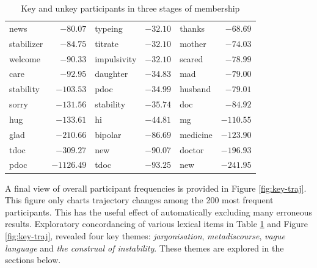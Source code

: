 \begin{table}[p]
\begin{tabular}{lrlrlr}
           news & $  -80.07$ &         typeing & $-32.10$ &      thanks & $ -68.69$ \\
     stabilizer & $  -84.75$ &         titrate & $-32.10$ &      mother & $ -74.03$ \\
        welcome & $  -90.33$ &     impulsivity & $-32.10$ &      scared & $ -78.99$ \\
           care & $  -92.95$ &        daughter & $-34.83$ &         mad & $ -79.00$ \\
      stability & $ -103.53$ &            pdoc & $-34.99$ &     husband & $ -79.01$ \\
          sorry & $ -131.56$ &       stability & $-35.74$ &         doc & $ -84.92$ \\
            hug & $ -133.61$ &              hi & $-44.81$ &          mg & $-110.55$ \\
           glad & $ -210.66$ &         bipolar & $-86.69$ &    medicine & $-123.90$ \\
           tdoc & $ -309.27$ &             new & $-90.07$ &      doctor & $-196.93$ \\
           pdoc & $-1126.49$ &            tdoc & $-93.25$ &         new & $-241.95$ \\
    \bottomrule
    \end{tabular}
    \caption{Key and unkey participants in three stages of membership}
    \label{tab:keyunkey-threestage}
    \end{table}
    \renewcommand{\arraystretch}{1.35}


A final view of overall participant frequencies is provided in Figure \ref{fig:key-traj}. This figure only charts trajectory changes among the 200 most frequent participants. This has the useful effect of automatically excluding many erroneous results. Exploratory concordancing of various lexical items in Table \ref{tab:keyunkey-threestage} and Figure \ref{fig:key-traj}, revealed four key \glspl{theme}: \emph{jargonisation}, \emph{metadiscourse}, \emph{vague language} and \emph{the construal of instability}. These \glspl{theme} are explored in the sections below. 

